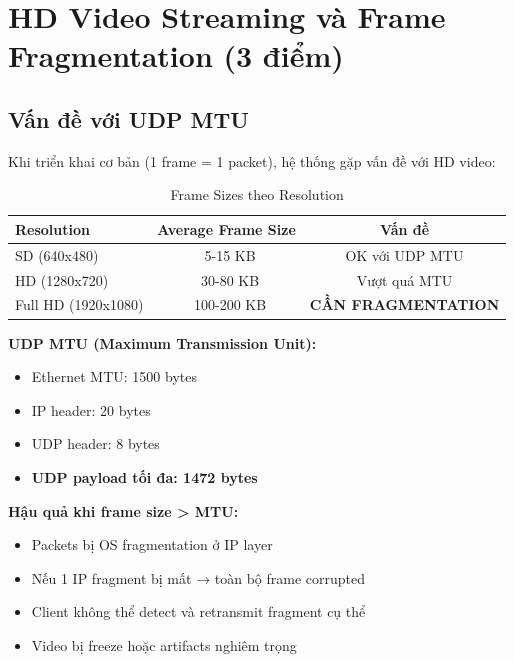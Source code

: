 
\section{HD Video Streaming và Frame Fragmentation (3 điểm)}

\subsection{Vấn đề với UDP MTU}

Khi triển khai cơ bản (1 frame = 1 packet), hệ thống gặp vấn đề với HD video:

\begin{table}[H]
\centering
\begin{tabular}{|l|c|c|}
\hline
\textbf{Resolution} & \textbf{Average Frame Size} & \textbf{Vấn đề} \\
\hline
SD (640x480) & ~5-15 KB & OK với UDP MTU \\
HD (1280x720) & ~30-80 KB & Vượt quá MTU \\
Full HD (1920x1080) & ~100-200 KB & \textbf{CẦN FRAGMENTATION} \\
\hline
\end{tabular}
\caption{Frame Sizes theo Resolution}
\end{table}

\textbf{UDP MTU (Maximum Transmission Unit):}
\begin{itemize}
    \item Ethernet MTU: 1500 bytes
    \item IP header: 20 bytes
    \item UDP header: 8 bytes
    \item \textbf{UDP payload tối đa: 1472 bytes}
\end{itemize}

\textbf{Hậu quả khi frame size > MTU:}
\begin{itemize}
    \item Packets bị OS fragmentation ở IP layer
    \item Nếu 1 IP fragment bị mất → toàn bộ frame corrupted
    \item Client không thể detect và retransmit fragment cụ thể
    \item Video bị freeze hoặc artifacts nghiêm trọng
\end{itemize}

